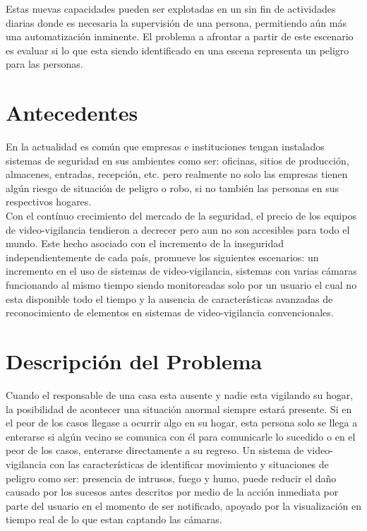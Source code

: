 Estas nuevas capacidades pueden ser explotadas en un sin fin de actividades diarias donde es necesaria la supervisión de una persona, permitiendo aún más una automatización inminente. El problema a afrontar a partir de este escenario es evaluar si lo que esta siendo identificado en una escena representa un peligro para las personas.

\section{Antecedentes}
En la actualidad es común que empresas e instituciones tengan instalados sistemas de seguridad en sus ambientes como ser: oficinas, sitios de producción, almacenes, entradas, recepción, etc. pero realmente no solo las empresas tienen algún riesgo de situación de peligro o robo, si no también las personas en sus respectivos hogares.\\

Con el contínuo crecimiento del mercado de la seguridad, el precio de los equipos de video-vigilancia tendieron a decrecer pero aun no son accesibles para todo el mundo. Este hecho asociado con el incremento de la inseguridad independientemente de cada país, promueve los siguientes escenarios: un incremento en el uso de sistemas de video-vigilancia, sistemas con varias cámaras funcionando al mismo tiempo siendo monitoreadas solo por un usuario el cual no esta disponible todo el tiempo y la ausencia de características avanzadas de reconocimiento de elementos en sistemas de video-vigilancia convencionales.\

\section{Descripción del Problema}
Cuando el responsable de una casa esta ausente y nadie esta vigilando su hogar, la posibilidad de acontecer una situación anormal siempre estará presente. Si en el peor de los casos llegase a ocurrir algo en su hogar, esta persona solo se llega a enterarse si algún vecino se comunica con él para comunicarle lo sucedido o en el peor de los casos, enterarse directamente a su regreso. Un sistema de video-vigilancia con las características de identificar movimiento y situaciones de peligro como ser: presencia de intrusos, fuego y humo, puede reducir el daño causado por los sucesos antes descritos por medio de la acción inmediata por parte del usuario en el momento de ser notificado, apoyado por la visualización en tiempo real de lo que estan captando las cámaras.\

